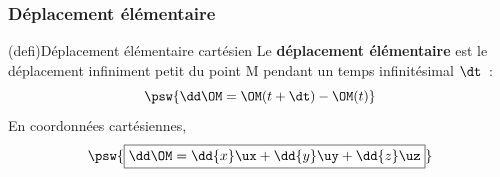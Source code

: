 \documentclass[../../main/main.tex]{subfiles}
\begin{document}
\subsubsection{Déplacement élémentaire}
\begin{tcb*}[sidebyside, righthand ratio=.25](defi){Déplacement élémentaire
			cartésien}
	Le \textbf{déplacement élémentaire} est le déplacement infiniment petit du
	point M pendant un temps infinitésimal $\dt$~:
	\[\psw{\dd\OM = \OM(t+\dt)-\OM(t)}\]
	En coordonnées cartésiennes,
	\[\psw{\boxed{\dd\OM = \dd{x}\ux + \dd{y}\uy + \dd{z}\uz}}\]
	\tcblower
	\begin{center}
\end{center}
\end{tcb*}
\end{document}
